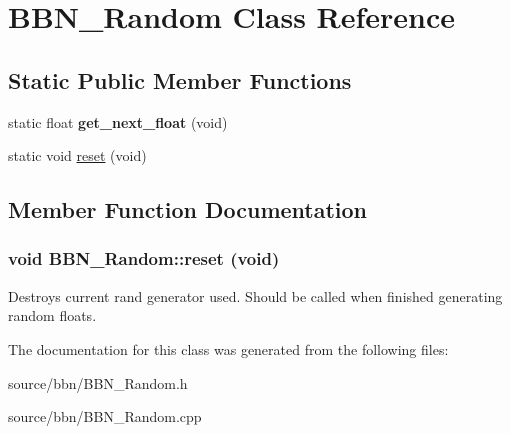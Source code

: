\hypertarget{classBBN__Random}{
\section{BBN\_\-Random Class Reference}
\label{classBBN__Random}
}
\subsection*{Static Public Member Functions}
\begin{DoxyCompactItemize}
\item 
\hypertarget{classBBN__Random_a66c1a1c7ad5d9d6e6ab0761a70044047}{
static float {\bfseries get\_\-next\_\-float} (void)}
\label{classBBN__Random_a66c1a1c7ad5d9d6e6ab0761a70044047}

\item 
static void \hyperlink{classBBN__Random_ace00423cb1975136e9804929e0e65263}{reset} (void)
\end{DoxyCompactItemize}


\subsection{Member Function Documentation}
\hypertarget{classBBN__Random_ace00423cb1975136e9804929e0e65263}{
\subsubsection[{reset}]{\setlength{\rightskip}{0pt plus 5cm}void BBN\_\-Random::reset (void)}}
\label{classBBN__Random_ace00423cb1975136e9804929e0e65263}
Destroys current rand generator used. Should be called when finished generating random floats. 

The documentation for this class was generated from the following files:\begin{DoxyCompactItemize}
\item 
source/bbn/BBN\_\-Random.h\item 
source/bbn/BBN\_\-Random.cpp\end{DoxyCompactItemize}
